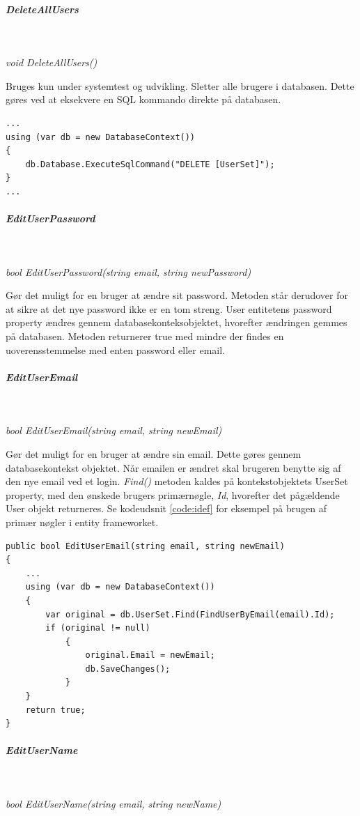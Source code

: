 \subparagraph{DeleteAllUsers}\

\textit{void DeleteAllUsers()}

Bruges kun under systemtest og udvikling.
Sletter alle brugere i databasen. Dette gøres ved at eksekvere en SQL kommando direkte på databasen. 

\begin{lstlisting}[caption=SQL injection på databasen ved sletning af brugere, label=sqlDeleteUsers]
...
using (var db = new DatabaseContext())
{
	db.Database.ExecuteSqlCommand("DELETE [UserSet]");
}
...	
\end{lstlisting}

\subparagraph{EditUserPassword}\

\textit{bool EditUserPassword(string email, string newPassword)}

Gør det muligt for en bruger at ændre sit password. Metoden står derudover for at sikre at det nye password ikke er en tom streng. User entitetens password property ændres gennem databasekonteksobjektet, hvorefter ændringen gemmes på databasen.
Metoden returnerer true med mindre der findes en uoverensstemmelse med enten password eller email.

\subparagraph{EditUserEmail}\

\textit{bool EditUserEmail(string email, string newEmail)}

Gør det muligt for en bruger at ændre sin email. Dette gøres gennem databasekontekst objektet. Når emailen er ændret skal brugeren benytte sig af den nye email ved et login. \textit{Find()} metoden kaldes på kontekstobjektets UserSet property, med den ønskede brugers primærnøgle, \textit{Id}, hvorefter det pågældende User objekt returneres. Se kodeudsnit \ref{code:idef} for eksempel på brugen af primær nøgler i entity frameworket.

\begin{lstlisting}[caption=EditUserEmail - brug af primær nøgler i Entity Framework,label=code:idef]
public bool EditUserEmail(string email, string newEmail)
{
	...
	using (var db = new DatabaseContext())
	{
		var original = db.UserSet.Find(FindUserByEmail(email).Id);
		if (original != null)
			{
				original.Email = newEmail;
				db.SaveChanges();
			}
	}
	return true;
}

\end{lstlisting}

\subparagraph{EditUserName}\

\textit{bool EditUserName(string email, string newName)}

